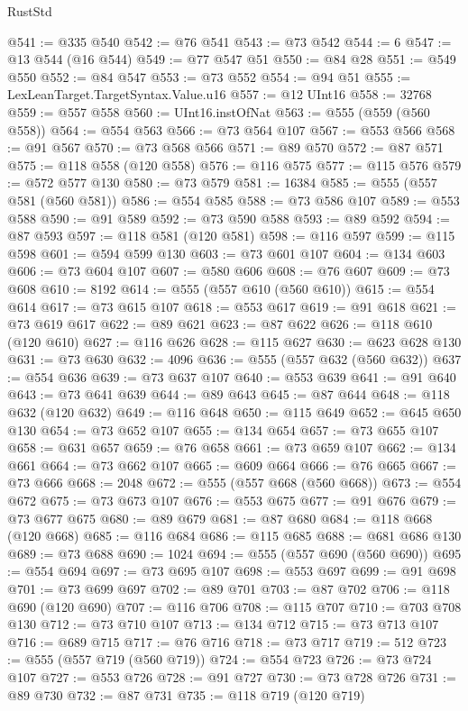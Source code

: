 \begin{lexlean}{RustStd}
\begin{coremodule}
{\begin{coremodule}
{{{{{@541 := @335 @540
@542 := @76 @541
@543 := @73 @542
@544 := 6
@547 := @13 @544 (@16 @544)
@549 := @77 @547 @51
@550 := @84 @28
@551 := @549 @550
@552 := @84 @547
@553 := @73 @552
@554 := @94 @51
@555 := LexLeanTarget.TargetSyntax.Value.u16
@557 := @12 UInt16
@558 := 32768
@559 := @557 @558
@560 := UInt16.instOfNat
@563 := @555 (@559 (@560 @558))
@564 := @554 @563
@566 := @73 @564 @107
@567 := @553 @566
@568 := @91 @567
@570 := @73 @568 @566
@571 := @89 @570
@572 := @87 @571
@575 := @118 @558 (@120 @558)
@576 := @116 @575
@577 := @115 @576
@579 := @572 @577 @130
@580 := @73 @579
@581 := 16384
@585 := @555 (@557 @581 (@560 @581))
@586 := @554 @585
@588 := @73 @586 @107
@589 := @553 @588
@590 := @91 @589
@592 := @73 @590 @588
@593 := @89 @592
@594 := @87 @593
@597 := @118 @581 (@120 @581)
@598 := @116 @597
@599 := @115 @598
@601 := @594 @599 @130
@603 := @73 @601 @107
@604 := @134 @603
@606 := @73 @604 @107
@607 := @580 @606
@608 := @76 @607
@609 := @73 @608
@610 := 8192
@614 := @555 (@557 @610 (@560 @610))
@615 := @554 @614
@617 := @73 @615 @107
@618 := @553 @617
@619 := @91 @618
@621 := @73 @619 @617
@622 := @89 @621
@623 := @87 @622
@626 := @118 @610 (@120 @610)
@627 := @116 @626
@628 := @115 @627
@630 := @623 @628 @130
@631 := @73 @630
@632 := 4096
@636 := @555 (@557 @632 (@560 @632))
@637 := @554 @636
@639 := @73 @637 @107
@640 := @553 @639
@641 := @91 @640
@643 := @73 @641 @639
@644 := @89 @643
@645 := @87 @644
@648 := @118 @632 (@120 @632)
@649 := @116 @648
@650 := @115 @649
@652 := @645 @650 @130
@654 := @73 @652 @107
@655 := @134 @654
@657 := @73 @655 @107
@658 := @631 @657
@659 := @76 @658
@661 := @73 @659 @107
@662 := @134 @661
@664 := @73 @662 @107
@665 := @609 @664
@666 := @76 @665
@667 := @73 @666
@668 := 2048
@672 := @555 (@557 @668 (@560 @668))
@673 := @554 @672
@675 := @73 @673 @107
@676 := @553 @675
@677 := @91 @676
@679 := @73 @677 @675
@680 := @89 @679
@681 := @87 @680
@684 := @118 @668 (@120 @668)
@685 := @116 @684
@686 := @115 @685
@688 := @681 @686 @130
@689 := @73 @688
@690 := 1024
@694 := @555 (@557 @690 (@560 @690))
@695 := @554 @694
@697 := @73 @695 @107
@698 := @553 @697
@699 := @91 @698
@701 := @73 @699 @697
@702 := @89 @701
@703 := @87 @702
@706 := @118 @690 (@120 @690)
@707 := @116 @706
@708 := @115 @707
@710 := @703 @708 @130
@712 := @73 @710 @107
@713 := @134 @712
@715 := @73 @713 @107
@716 := @689 @715
@717 := @76 @716
@718 := @73 @717
@719 := 512
@723 := @555 (@557 @719 (@560 @719))
@724 := @554 @723
@726 := @73 @724 @107
@727 := @553 @726
@728 := @91 @727
@730 := @73 @728 @726
@731 := @89 @730
@732 := @87 @731
@735 := @118 @719 (@120 @719)
}}}}}
\end{coremodule}}
\end{coremodule}
\end{lexlean}
